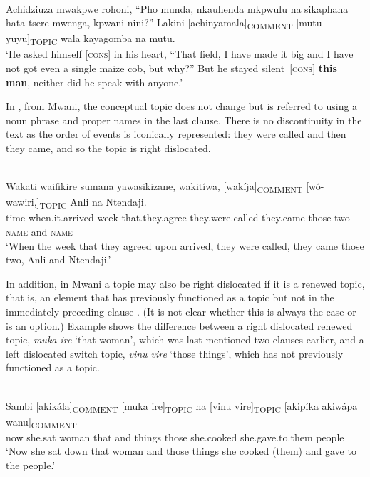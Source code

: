 \documentclass[output=paper]{langsci/langscibook}
\begin{document}
\ea\label{ex:11.nicolle}
\\
  Achidziuza mwakpwe rohoni, “Pho munda, nkauhenda mkpwulu na sikaphaha hata tsere mwenga, kpwani nini?” Lakini [achinyamala]\textsubscript{COMMENT} [mutu yuyu]\textsubscript{TOPIC} wala kayagomba na mutu.\\ 
\glt ‘He asked himself [\textsc{cons}] in his heart, “That field, I have made it big and I have not got even a single maize cob, but why?” But he stayed silent~[\textsc{cons}] \textbf{this man}, neither did he speak with anyone.’
\z

In , from Mwani, the conceptual topic does not change but is referred to using a noun phrase and proper names in the last clause. There is no discontinuity in the text as the order of events is iconically represented: they were called and then they came, and so the topic is right dislocated.

\ea\label{ex:12.nicolle}
\\
\gll Wakati waifikire sumana yawasikizane, wakitíwa, [wakíja]\textsubscript{COMMENT} [wó-wawiri,]\textsubscript{TOPIC} Anli na Ntendaji.\\
time when.it.arrived week that.they.agree they.were.called {\db}they.came {\db}those-two \textsc{name} and \textsc{name}\\
\glt ‘When the week that they agreed upon arrived, they were called, they came those two, Anli and Ntendaji.’
\z

In addition, in Mwani a topic may also be right dislocated if it is a renewed topic, that is, an element that has previously functioned as a topic but not in the immediately preceding clause \citep[10-11]{floor2005}. (It is not clear whether this is always the case or is an option.) Example  shows the difference between a right dislocated renewed topic, \textit{muk}\textit{a ire} ‘that woman’, which was last mentioned two clauses earlier, and a left dislocated switch topic, \textit{vinu vire} ‘those things’, which has not previously functioned as a topic.

\ea\label{ex:13.nicolle}
\\
\gll Sambi [akikála]\textsubscript{COMMENT} [muka ire]\textsubscript{TOPIC} na [vinu vire]\textsubscript{TOPIC} [akipíka akiwápa wanu]\textsubscript{COMMENT}\\
now {\db}she.sat {\db}woman that and {\db}things those {\db}she.cooked she.gave.to.them people\\
\glt ‘Now she sat down that woman and those things she cooked (them) and gave to the people.’
\z
\end{document}
